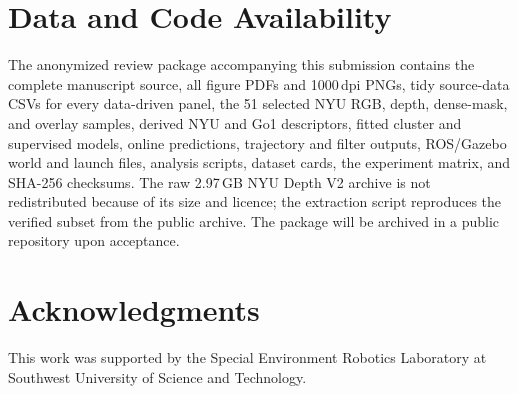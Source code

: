 \documentclass[11pt, a4paper]{article}
\begin{document}
\section*{Data and Code Availability}
The anonymized review package accompanying this submission contains the complete manuscript source, all figure PDFs and 1000\,dpi PNGs, tidy source-data CSVs for every data-driven panel, the 51 selected NYU RGB, depth, dense-mask, and overlay samples, derived NYU and Go1 descriptors, fitted cluster and supervised models, online predictions, trajectory and filter outputs, ROS/Gazebo world and launch files, analysis scripts, dataset cards, the experiment matrix, and SHA-256 checksums. The raw 2.97\,GB NYU Depth V2 archive is not redistributed because of its size and licence; the extraction script reproduces the verified subset from the public archive. The package will be archived in a public repository upon acceptance.

\section*{Acknowledgments}
This work was supported by the Special Environment Robotics Laboratory at Southwest University of Science and Technology.
\end{document}

